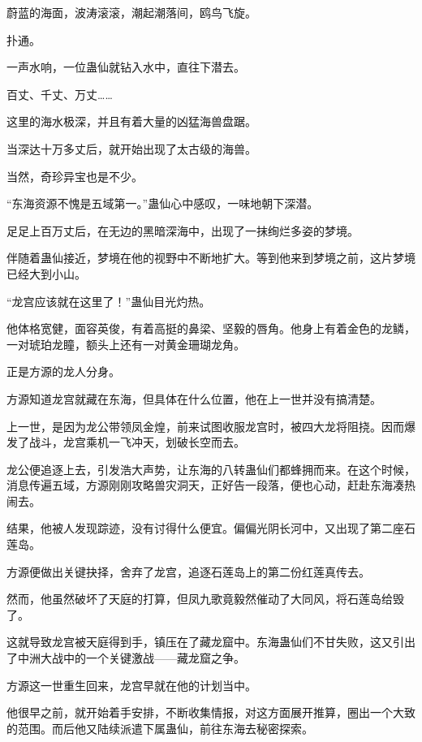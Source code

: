 
\begin{this_body}

蔚蓝的海面，波涛滚滚，潮起潮落间，鸥鸟飞旋。

扑通。

一声水响，一位蛊仙就钻入水中，直往下潜去。

百丈、千丈、万丈……

这里的海水极深，并且有着大量的凶猛海兽盘踞。

当深达十万多丈后，就开始出现了太古级的海兽。

当然，奇珍异宝也是不少。

“东海资源不愧是五域第一。”蛊仙心中感叹，一味地朝下深潜。

足足上百万丈后，在无边的黑暗深海中，出现了一抹绚烂多姿的梦境。

伴随着蛊仙接近，梦境在他的视野中不断地扩大。等到他来到梦境之前，这片梦境已经大到小山。

“龙宫应该就在这里了！”蛊仙目光灼热。

他体格宽健，面容英俊，有着高挺的鼻梁、坚毅的唇角。他身上有着金色的龙鳞，一对琥珀龙瞳，额头上还有一对黄金珊瑚龙角。

正是方源的龙人分身。

方源知道龙宫就藏在东海，但具体在什么位置，他在上一世并没有搞清楚。

上一世，是因为龙公带领凤金煌，前来试图收服龙宫时，被四大龙将阻挠。因而爆发了战斗，龙宫乘机一飞冲天，划破长空而去。

龙公便追逐上去，引发浩大声势，让东海的八转蛊仙们都蜂拥而来。在这个时候，消息传遍五域，方源刚刚攻略兽灾洞天，正好告一段落，便也心动，赶赴东海凑热闹去。

结果，他被人发现踪迹，没有讨得什么便宜。偏偏光阴长河中，又出现了第二座石莲岛。

方源便做出关键抉择，舍弃了龙宫，追逐石莲岛上的第二份红莲真传去。

然而，他虽然破坏了天庭的打算，但凤九歌竟毅然催动了大同风，将石莲岛给毁了。

这就导致龙宫被天庭得到手，镇压在了藏龙窟中。东海蛊仙们不甘失败，这又引出了中洲大战中的一个关键激战——藏龙窟之争。

方源这一世重生回来，龙宫早就在他的计划当中。

他很早之前，就开始着手安排，不断收集情报，对这方面展开推算，圈出一个大致的范围。而后他又陆续派遣下属蛊仙，前往东海去秘密探索。


\end{this_body}
